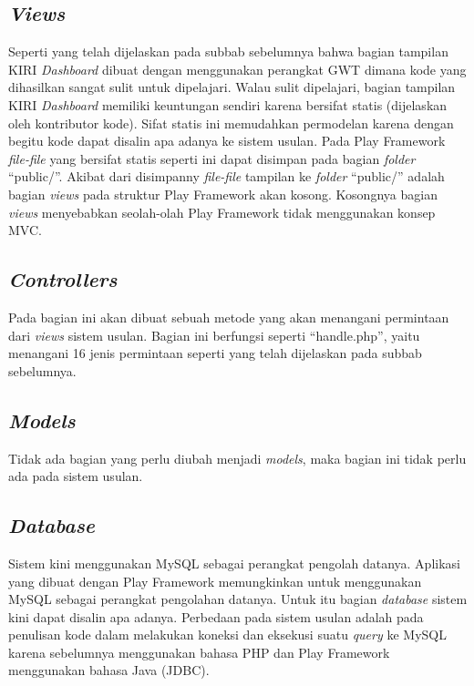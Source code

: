 \subsection{\textit{Views}}
\label{sec:viewusulan}
Seperti yang telah dijelaskan pada subbab sebelumnya bahwa bagian tampilan KIRI \textit{Dashboard} dibuat dengan menggunakan perangkat GWT dimana kode yang dihasilkan sangat sulit untuk dipelajari. Walau sulit dipelajari, bagian tampilan KIRI \textit{Dashboard} memiliki keuntungan sendiri karena bersifat statis (dijelaskan oleh kontributor kode). Sifat statis ini memudahkan permodelan karena dengan begitu kode dapat disalin apa adanya ke sistem usulan. Pada Play Framework \textit{file-file} yang bersifat statis seperti ini dapat disimpan pada bagian \textit{folder} ``public/''. Akibat dari disimpanny \textit{file-file} tampilan ke \textit{folder} ``public/'' adalah bagian \textit{views} pada struktur Play Framework akan kosong. Kosongnya bagian \textit{views} menyebabkan seolah-olah Play Framework tidak menggunakan konsep MVC.

\subsection{\textit{Controllers}}
\label{sec:controllerusulan}
Pada bagian ini akan dibuat sebuah metode yang akan menangani permintaan dari \textit{views} sistem usulan. Bagian ini berfungsi seperti ``handle.php'', yaitu menangani 16 jenis permintaan seperti yang telah dijelaskan pada subbab sebelumnya.

\subsection{\textit{Models}}
\label{sec:modelusulan}
Tidak ada bagian yang perlu diubah menjadi \textit{models}, maka bagian ini tidak perlu ada pada sistem usulan.

\subsection{\textit{Database}}
\label{sec:databaseusulan}
Sistem kini menggunakan MySQL sebagai perangkat pengolah datanya. Aplikasi yang dibuat dengan Play Framework memungkinkan untuk menggunakan MySQL sebagai perangkat pengolahan datanya. Untuk itu bagian \textit{database} sistem kini dapat disalin apa adanya. Perbedaan pada sistem usulan adalah pada penulisan kode dalam melakukan koneksi dan eksekusi suatu \textit{query} ke MySQL karena sebelumnya menggunakan bahasa PHP dan Play Framework menggunakan bahasa Java (JDBC).